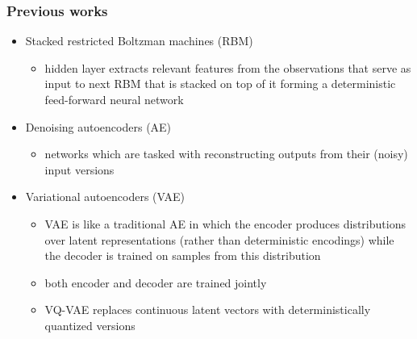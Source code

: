 \documentclass[table]{beamer}
\begin{document}
\begin{frame}
\frametitle{Previous works}
\begin{itemize}
	\item Stacked restricted Boltzman machines (RBM) \citep{HinSal06}
		\begin{itemize}
		\item hidden layer extracts relevant features from the observations that serve as input to next RBM that is stacked on top of it forming a deterministic feed-forward neural network
		\end{itemize}
	\item Denoising autoencoders (AE) \citep{Vincent08extractingand}
		\begin{itemize}
		\item networks which are tasked with reconstructing outputs from their (noisy) input versions
		\end{itemize}
	\item Variational autoencoders (VAE) \citep{kingma2013autoencoding}
		\begin{itemize}
		\item VAE is like a traditional AE in which the encoder produces distributions over latent representations (rather than deterministic encodings) while the decoder is trained on samples from this distribution
		\item both encoder and decoder are trained jointly
		\item VQ-VAE \citep{NIPS2017_7210} replaces continuous latent vectors with deterministically quantized versions
		\end{itemize}
\end{itemize}

\end{frame}
\end{document}
